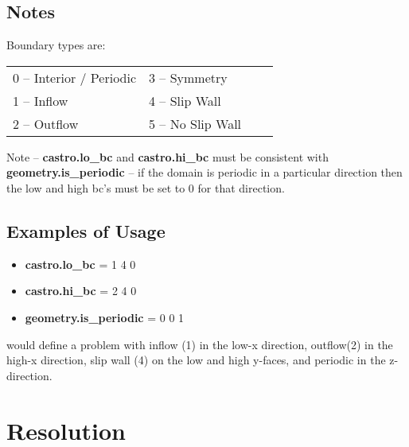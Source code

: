\subsection{Notes}

Boundary types are:

\begin{table*}[h]
\begin{center}
\begin{tabular}{llll} 
0 --  Interior / Periodic \hspace{1.in} & 3  --  Symmetry     \hspace{1.in} & \\
1 --  Inflow              \hspace{1.in} & 4  --  Slip Wall    \hspace{1.in}& \\
2 --  Outflow             \hspace{1.in} & 5  --  No Slip Wall \hspace{1.in}& \\
\end{tabular}
\end{center}
\end{table*}

\noindent Note -- {\bf castro.lo\_bc} and {\bf castro.hi\_bc} must be consistent with 
{\bf geometry.is\_periodic} -- if the domain is periodic in a particular
direction then the low and high bc's must be set to 0 for that direction.

\subsection{Examples of Usage}

\begin{itemize}

\item {\bf castro.lo\_bc} = 1 4 0 

\item {\bf castro.hi\_bc} = 2 4 0 

\item {\bf geometry.is\_periodic} = 0 0 1

\end{itemize}

\noindent would define a problem with inflow (1) in the low-x direction, 
outflow(2) in the high-x direction, slip wall (4) on the low and high y-faces, 
and periodic in the z-direction. 

\section{Resolution}
